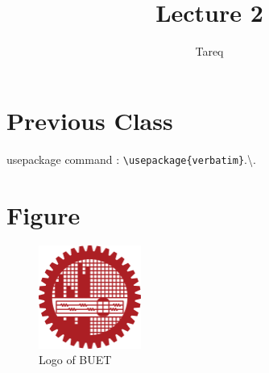 \documentclass{article}
\title{Lecture 2}
\author{Tareq}
\begin{document}
\maketitle
\tableofcontents


\section{Previous Class}

usepackage command : \verb|\usepackage{verbatim}|.\textbackslash.


\section{Figure}

\begin{figure}[h]
	\centering
	\includegraphics[width=0.3\textwidth]{buetlogo.png}
	\caption{Logo of BUET}
	\label{fig:buetlogo}
\end{figure}
\end{document}
